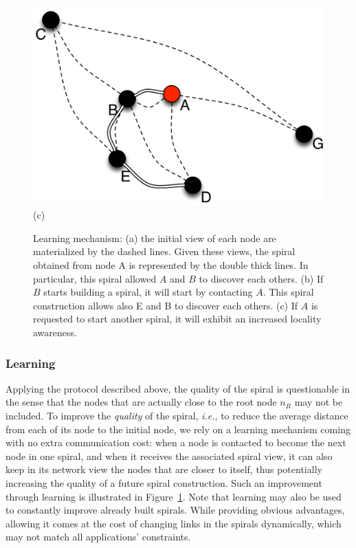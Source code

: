 \begin{figure}[ht]
{\begin{center}
{\begin{minipage}{.3\linewidth}
	  \begin{center}
	    \includegraphics[width=1.05\linewidth]{Figures/learning3.png}\\(c)
	  \end{center}
	\end{minipage}
	\caption{Learning mechanism: (a) the initial view of each node are materialized by
          the dashed lines. Given these views, the spiral obtained from node A is
          represented by the double thick lines. In particular, this spiral allowed $A$
          and $B$ to discover each others. (b) If $B$ starts building a spiral, it will
          start by contacting $A$. This spiral construction allows also E and B to
          discover each others. (c) If $A$ is requested to start another spiral, it will
          exhibit an increased locality awareness.\label{fig:learning}} }
      \end{center}
}
\end{figure}

\subsubsection*{Learning}

Applying the protocol described above, the quality of the spiral is questionable in the
sense that the nodes that are actually close to the root node $n_R$ may not be
included.%
%
To improve the \emph{quality} of the spiral, \emph{i.e.}, to reduce the average
distance from each of its node to the initial node, we rely on a learning
mechanism coming with no extra communication cost: when a node is contacted to
become the next node in one spiral, and when it receives the associated spiral
view, it can also keep in its network view the nodes that are closer to itself,
thus potentially increasing the quality of a future spiral construction. Such an
improvement through learning is illustrated in Figure~\ref{fig:learning}. Note
that learning may also be used to constantly improve already built
spirals. While providing obvious advantages, allowing it comes at the cost of
changing links in the spirals dynamically, which may not match all applications'
constraints.

